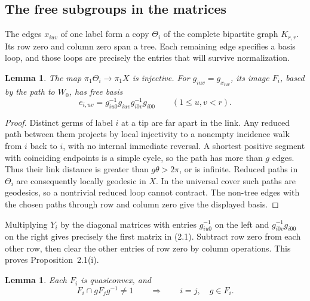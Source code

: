 \documentclass[11pt,a4paper]{article}
\newtheorem{lemma}[theorem]{Lemma}
\numberwithin{equation}{section}
\begin{document}
\subsection{The free subgroups in the matrices}

The edges \(x_{iuv}\) of one label form a copy \(\Theta_i\) of the complete bipartite graph \(K_{r,r}\). Its row zero and column zero span a tree. Each remaining edge specifies a basis loop, and those loops are precisely the entries that will survive normalization.

\begin{lemma}
The map \(\pi_1\Theta_i\to\pi_1X\) is injective. For \(g_{iuv}=g_{x_{iuv}}\), its image \(F_i\), based by the path to \(W_0\), has free basis
\begin{equation}
 e_{i,uv}=g_{iu0}^{-1}g_{iuv}g_{i0v}^{-1}g_{i00}\qquad(1\le u,v<r).
\end{equation}
\end{lemma}

\begin{proof}
Distinct germs of label \(i\) at a tip are far apart in the link. Any reduced path between them projects by local injectivity to a nonempty incidence walk from \(i\) back to \(i\), with no internal immediate reversal. A shortest positive segment with coinciding endpoints is a simple cycle, so the path has more than \(g\) edges. Thus their link distance is greater than \(g\theta>2\pi\), or is infinite. Reduced paths in \(\Theta_i\) are consequently locally geodesic in \(X\). In the universal cover such paths are geodesics, so a nontrivial reduced loop cannot contract. The non-tree edges with the chosen paths through row and column zero give the displayed basis.
\end{proof}

Multiplying \(Y_i\) by the diagonal matrices with entries \(g_{iu0}^{-1}\) on the left and \(g_{i0v}^{-1}g_{i00}\) on the right gives precisely the first matrix in (2.1). Subtract row zero from each other row, then clear the other entries of row zero by column operations. This proves Proposition~2.1(i).

\begin{lemma}
Each \(F_i\) is quasiconvex, and
\begin{equation}
 F_i\cap gF_jg^{-1}\ne 1\qquad\Longrightarrow\qquad i=j,\quad g\in F_i .
\end{equation}
\end{lemma}
\end{document}
